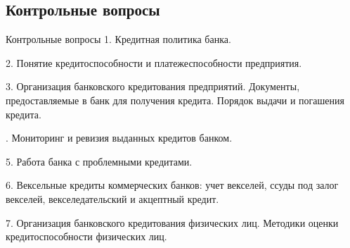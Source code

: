 \documentclass[_Banking_p2.tex]{subfiles}
\begin{document}
\subsection{Контрольные вопросы}
\begin{frame}[ allowframebreaks ]{Контрольные вопросы}
1. Кредитная политика банка.

2. Понятие кредитоспособности и платежеспособности предприятия.

3. Организация банковского кредитования предприятий. Документы, предоставляемые в банк для получения кредита. Порядок выдачи и погашения кредита.

. Мониторинг и ревизия выданных кредитов банком.

5. Работа банка с проблемными кредитами.

6. Вексельные кредиты коммерческих банков: учет векселей, ссуды под залог векселей, векселедательский и акцептный кредит.

7. Организация банковского кредитования физических лиц. Методики оценки кредитоспособности физических лиц.

\end{frame}

\end{document}
